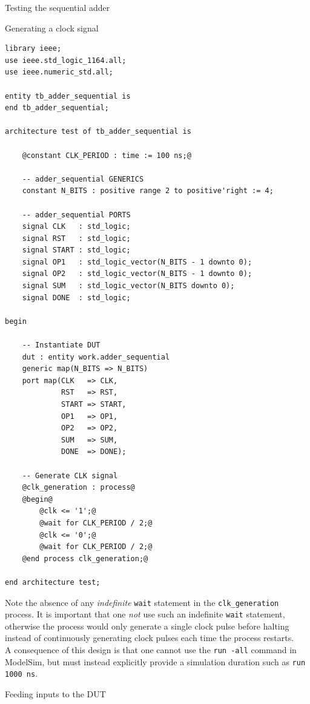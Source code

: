 \documentclass[lab]{course}
\begin{document}
\begin{section}{Testing the sequential adder}
\begin{subsection}{Generating a clock signal}
        \begin{lstlisting}[caption={Add process for generating \texttt{CLK} signal}, label={lst:sequential_process_generate_clk}]
library ieee;
use ieee.std_logic_1164.all;
use ieee.numeric_std.all;

entity tb_adder_sequential is
end tb_adder_sequential;

architecture test of tb_adder_sequential is

    @constant CLK_PERIOD : time := 100 ns;@

    -- adder_sequential GENERICS
    constant N_BITS : positive range 2 to positive'right := 4;

    -- adder_sequential PORTS
    signal CLK   : std_logic;
    signal RST   : std_logic;
    signal START : std_logic;
    signal OP1   : std_logic_vector(N_BITS - 1 downto 0);
    signal OP2   : std_logic_vector(N_BITS - 1 downto 0);
    signal SUM   : std_logic_vector(N_BITS downto 0);
    signal DONE  : std_logic;

begin

    -- Instantiate DUT
    dut : entity work.adder_sequential
    generic map(N_BITS => N_BITS)
    port map(CLK   => CLK,
             RST   => RST,
             START => START,
             OP1   => OP1,
             OP2   => OP2,
             SUM   => SUM,
             DONE  => DONE);

    -- Generate CLK signal
    @clk_generation : process@
    @begin@
        @clk <= '1';@
        @wait for CLK_PERIOD / 2;@
        @clk <= '0';@
        @wait for CLK_PERIOD / 2;@
    @end process clk_generation;@

end architecture test;
        \end{lstlisting}

        Note the absence of any \emph{indefinite} \verb+wait+ statement in the \verb+clk_generation+ process. It is important that one \emph{not} use such an indefinite \verb+wait+ statement, otherwise the process would only generate a single clock pulse before halting instead of continuously generating clock pulses each time the process restarts. \\

        A consequence of this design is that one cannot use the \verb+run -all+ command in ModelSim, but must instead explicitly provide a simulation duration such as \verb+run 1000 ns+.
    \end{subsection}

    \begin{subsection}{Feeding inputs to the DUT}


\end{subsection}
\end{section}
\end{document}
